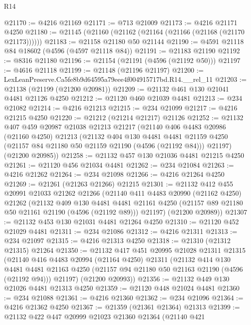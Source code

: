 \begin{lexlean}{R14}
\begin{coremodule}
@21170 := @4216 @21169
@21171 := @713 @21009
@21173 := @4216 @21171 @4250
@21180 := @21145 (@21160 (@21162 (@21164 (@21166 (@21168 (@21170 @21173))))))
@21183 := @21158 @21180 @50 @21144
@21190 := @4591 @21118 @84 @18602 (@4596 (@4597 @21118 @84))
@21191 := @21183 @21190
@21192 := @8316 @21180
@21196 := @21154 (@21191 (@4596 (@21192 @50)))
@21197 := @4616 @21118
@21199 := @21148 (@21196 @21197)
@21200 := LexLeanPreserve.Ca5fe8b9d64595a79eee4f004915717bd.R14.__rel_11
@21203 := @21138 (@21199 (@21200 @20981))
@21209 := @21132 @461 @130 @21041 @4481 @21126 @4250
@21212 := @21120 @460 @21039 @4481
@21213 := @234 @21082
@21214 := @4216 @21213
@21215 := @234 @21099
@21217 := @4216 @21215 @4250
@21220 := @21212 (@21214 @21217) @21126
@21252 := @21132
    @407
    @459
    @20987
    @21038
    @21213
    @21217
    (@21140
      @406
      @4483
      @20986
      (@21160 @4250)
      @21213
      (@21132
        @404
        @130
        @4481
        @4481
        @21159
        @4250
        (@21157 @84 @21180 @50 @21159 @21190 (@4596 (@21192 @84)))
        @21197)
      (@21200 @20985))
@21258 := @21132 @457 @130 @21036 @4481 @21215 @4250
@21261 := @21120 @456 @21034 @4481
@21262 := @234 @21084
@21263 := @4216 @21262
@21264 := @234 @21098
@21266 := @4216 @21264 @4250
@21269 := @21261 (@21263 @21266) @21215
@21301 := @21132
    @412
    @455
    @20991
    @21033
    @21262
    @21266
    (@21140
      @411
      @4483
      @20990
      (@21162 @4250)
      @21262
      (@21132
        @409
        @130
        @4481
        @4481
        @21161
        @4250
        (@21157 @89 @21180 @50 @21161 @21190 (@4596 (@21192 @89)))
        @21197)
      (@21200 @20989))
@21307 := @21132 @453 @130 @21031 @4481 @21264 @4250
@21310 := @21120 @452 @21029 @4481
@21311 := @234 @21086
@21312 := @4216 @21311
@21313 := @234 @21097
@21315 := @4216 @21313 @4250
@21318 := @21310 (@21312 @21315) @21264
@21350 := @21132
    @417
    @451
    @20995
    @21028
    @21311
    @21315
    (@21140
      @416
      @4483
      @20994
      (@21164 @4250)
      @21311
      (@21132
        @414
        @130
        @4481
        @4481
        @21163
        @4250
        (@21157 @94 @21180 @50 @21163 @21190 (@4596 (@21192 @94)))
        @21197)
      (@21200 @20993))
@21356 := @21132 @449 @130 @21026 @4481 @21313 @4250
@21359 := @21120 @448 @21024 @4481
@21360 := @234 @21088
@21361 := @4216 @21360
@21362 := @234 @21096
@21364 := @4216 @21362 @4250
@21367 := @21359 (@21361 @21364) @21313
@21399 := @21132
    @422
    @447
    @20999
    @21023
    @21360
    @21364
    (@21140
      @421

\end{coremodule}
\end{lexlean}
